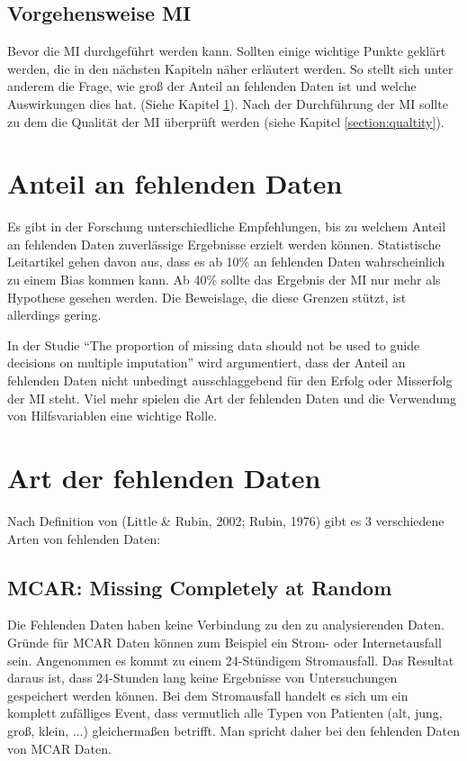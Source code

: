 \subsection{Vorgehensweise MI}

Bevor die MI durchgeführt werden kann. Sollten einige wichtige Punkte geklärt werden, die in den nächsten 
Kapiteln näher erläutert werden. So stellt sich unter anderem die Frage, wie groß der Anteil an fehlenden 
Daten ist und welche Auswirkungen dies hat. (Siehe Kapitel \ref{section:missing_data}). Nach der 
Durchführung der MI sollte zu dem die Qualität der MI überprüft werden (siehe Kapitel \ref{section:qualtity}).


\section{Anteil an fehlenden Daten}
\label{section:missing_data}

Es gibt in der Forschung unterschiedliche Empfehlungen, bis zu welchem Anteil an fehlenden 
Daten zuverlässige Ergebnisse erzielt werden können. Statistische Leitartikel gehen davon aus, 
dass es ab 10\% an fehlenden Daten wahrscheinlich zu einem Bias kommen kann. Ab 40\% sollte 
das Ergebnis der MI nur mehr als Hypothese gesehen werden. Die Beweislage, die diese Grenzen 
stützt, ist allerdings gering. \autocite[63 f.]{Madley-Dowd2019}

In der Studie “The proportion of missing data should not be used to guide decisions on multiple imputation” wird 
argumentiert, dass der Anteil an fehlenden Daten nicht unbedingt ausschlaggebend für den Erfolg oder Misserfolg der 
MI steht. Viel mehr spielen die Art der fehlenden Daten und die Verwendung von Hilfsvariablen eine wichtige Rolle. 

\section{Art der fehlenden Daten}
\label{section:descriptor_of_missingness}

Nach Definition von (Little \& Rubin, 2002; Rubin, 1976) gibt es 3 verschiedene Arten von fehlenden Daten:

\subsection{MCAR: Missing Completely at Random}

Die Fehlenden Daten haben keine Verbindung zu den zu analysierenden Daten. Gründe für MCAR Daten 
können zum Beispiel ein Strom- oder Internetausfall sein. \autocite[8]{Enders2017} Angenommen es kommt zu einem 24-Stündigem Stromausfall.
Das Resultat daraus ist, dass 24-Stunden lang keine Ergebnisse von Untersuchungen gespeichert werden können. Bei dem Stromausfall
handelt es sich um ein komplett zufälliges Event, dass vermutlich alle Typen von Patienten (alt, jung, groß, klein, ...) gleichermaßen betrifft.
Man spricht daher bei den fehlenden Daten von MCAR Daten. 

